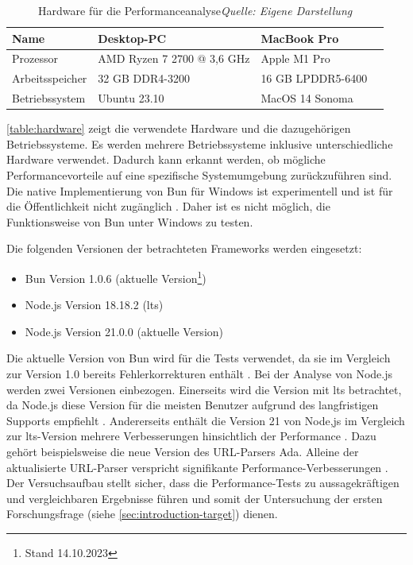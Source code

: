 \begin{table}[h]
	\caption[Hardware für die Performanceanalyse]{Hardware für die Performanceanalyse\protect\linebreak\textit{Quelle: Eigene Darstellung}}
	\label{table:hardware}
	\centering
	\begin{tabular}{|p{4.5cm}|p{4.5cm}|p{4.5cm}|p{4.5cm}|}
		\hline
		Name & Desktop-PC & MacBook Pro \\
		\hline
		Prozessor & AMD Ryzen 7 2700 @ 3,6 GHz & Apple M1 Pro \\
		\hline
		Arbeitsspeicher & 32 GB DDR4-3200 & 16 GB LPDDR5-6400 \\
		\hline
		Betriebssystem & Ubuntu 23.10 & MacOS 14 Sonoma \\
		\hline
	\end{tabular}
\end{table}

\noindent
\autoref{table:hardware} zeigt die verwendete Hardware und die dazugehörigen Betriebssysteme. Es werden mehrere Betriebssysteme inklusive unterschiedliche Hardware verwendet. Dadurch kann erkannt werden, ob mögliche Performancevorteile auf eine spezifische Systemumgebung zurückzuführen sind. Die native Implementierung von Bun für Windows ist experimentell und ist für die Öffentlichkeit nicht zugänglich \cite{Verhelst.2023}. Daher ist es nicht möglich, die Funktionsweise von Bun unter Windows zu testen.

\noindent
Die folgenden Versionen der betrachteten Frameworks werden eingesetzt:
\begin{itemize}
	\item Bun Version 1.0.6 (aktuelle Version\footnote{Stand 14.10.2023\label{footnote:Stand}})
	\item Node.js Version 18.18.2 (\ac{lts})
	\item Node.js Version 21.0.0 (aktuelle Version)
\end{itemize}

\noindent
Die aktuelle Version von Bun wird für die Tests verwendet, da sie im Vergleich zur Version 1.0 bereits Fehlerkorrekturen enthält \cite{Sumner.2023b}. Bei der Analyse von Node.js werden zwei Versionen einbezogen. Einerseits wird die Version mit \ac{lts} betrachtet, da Node.js diese Version für die meisten Benutzer aufgrund des langfristigen Supports empfiehlt \cite{OpenJSFoundation.o.J.}. Andererseits enthält die Version 21 von Node,js im Vergleich zur \ac{lts}-Version mehrere Verbesserungen hinsichtlich der Performance \cite{OpenJSFoundation.2023b}. Dazu gehört beispielsweise die neue Version des URL-Parsers Ada. Alleine der aktualisierte URL-Parser verspricht signifikante Performance-Verbesserungen \cite{OpenJSFoundation.2023}.\newline
Der Versuchsaufbau stellt sicher, dass die Performance-Tests zu aussagekräftigen und vergleichbaren Ergebnisse führen und somit der Untersuchung der ersten Forschungsfrage (siehe \autoref{sec:introduction-target}) dienen.

